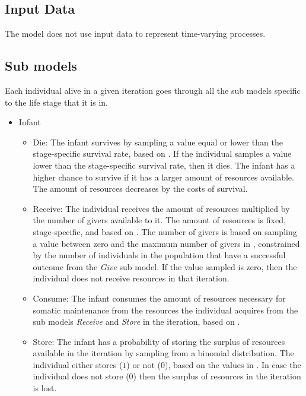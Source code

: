 \documentclass{article}
\begin{document}
\subsection{Input Data}

The model does not use input data to represent time-varying processes.

\subsection{Sub models}

Each individual alive in a given iteration goes through all the sub models specific to the life stage that it is in.

\begin{itemize}
    \item Infant
    \begin{itemize}
        \item Die: The infant survives by sampling a value equal or lower than the stage-specific survival rate, based on \cite{gurven2007longevity}. If the individual samples a value lower than the stage-specific survival rate, then it dies. The infant has a higher chance to survive if it has a larger amount of resources available. The amount of resources decreases by the costs of survival.
        \item Receive: The individual receives the amount of resources multiplied by the number of givers available to it. The amount of resources is fixed, stage-specific, and based on \cite{gurven2004give}. The number of givers is based on sampling a value between zero and the maximum number of givers in \cite{gurven2004give}, constrained by the number of individuals in the population that have a successful outcome from the \emph{Give} sub model. If the value sampled is zero, then the individual does not receive resources in that iteration.
        \item Consume: The infant consumes the amount of resources necessary for somatic maintenance from the resources the individual acquires from the sub models  \emph{Receive} and \emph{Store} in the iteration, based on \cite{kaplan2000theory, pontzer2021daily}.
        \item Store: The infant has a probability of storing the surplus of resources available in the iteration by sampling from a binomial distribution. The individual either stores ($1$) or not ($0$), based on the values in \citep{bowles2011cultivation}. In case the individual does not store ($0$) then the surplus  of resources in the iteration is lost.

\end{itemize}
\end{itemize}
\end{document}
